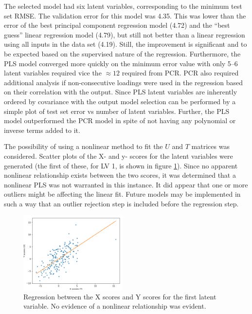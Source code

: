 \documentclass{IEEEtran}
\begin{document}
The selected model had six latent variables, corresponding to the minimum test set RMSE. The validation error for this model was \num{4.35}. This was lower than the error of the best principal component regression model (\num{4.72}) and the ``best guess'' linear regression model (\num{4.79}), but still not better than a linear regression using all inputs in the data set (\num{4.19}). Still, the improvement is significant and to be expected based on the supervised nature of the regression. Furthermore, the PLS model converged more quickly on the minimum error value with only \numrange{5}{6} latent variables required vice the $\approx\num{12}$ required from PCR. PCR also required additional analysis if non-consecutive loadings were used in the regression based on their correlation with the output. Since PLS latent variables are inherently ordered by covariance with the output model selection can be performed by a simple plot of test set error vs number of latent variables. Further, the PLS model outperformed the PCR model in spite of not having any polynomial or inverse terms added to it.

The possibility of using a nonlinear method to fit the $U$ and $T$ matrices was considered. Scatter plots of the X- and y- scores for the latent variables were generated (the first of these, for LV 1, is shown in figure \ref{fig:pls_first_scores_regression}). Since no apparent nonlinear relationship exists between the two scores, it was determined that a nonlinear PLS was not warranted in this instance. It did appear that one or more outliers might be affecting the linear fit. Future models may be implemented in such a way that an outlier rejection step is included before the regression step.

\begin{centering}
\begin{figure}
\centering
\begin{center}
	\includegraphics[width=0.48\textwidth]{pls_first_scores_regression}
	\caption{Regression between the X scores and Y scores for the first latent variable. No evidence of a nonlinear relationship was evident.\label{fig:pls_first_scores_regression}}
\end{center}
\end{figure}
\end{centering}
\end{document}
